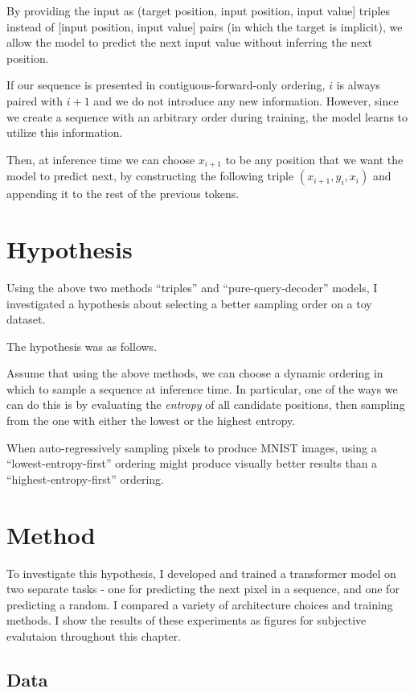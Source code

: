 By providing the input as (target position, input position, input value] triples instead of [input position, input value] pairs (in which the target is implicit), we allow the model to predict the next input value without inferring the next position.

If our sequence is presented in contiguous-forward-only ordering, $i$ is always paired with $i+1$ and we do not introduce any new information. However, since we create a sequence with an arbitrary order during training, the model learns to utilize this information.

Then, at inference time we can choose $x_{i+1}$ to be any position that we want the model to predict next, by constructing the following triple $(x_{i+1}, y_i, x_i)$ and appending it to the rest of the previous tokens.


\section{Hypothesis}
\label{s:a-o-hypotheses}

Using the above two methods ``triples'' and ``pure-query-decoder'' models, I investigated a hypothesis about selecting a better sampling order on a toy dataset.

The hypothesis was as follows.

Assume that using the above methods, we can choose a dynamic ordering in which to sample a sequence at inference time. In particular, one of the ways we can do this is by evaluating the \textit{entropy} of all candidate positions, then sampling from the one with either the lowest or the highest entropy.

When auto-regressively sampling pixels to produce MNIST images, using a ``lowest-entropy-first'' ordering might produce visually better results than a ``highest-entropy-first'' ordering.

\section{Method}

To investigate this hypothesis, I developed and trained a transformer model on two separate tasks - one for predicting the next pixel in a sequence, and one for predicting a random. I compared a variety of architecture choices and training methods. I show the results of these experiments as figures for subjective evalutaion throughout this chapter.

\subsection{Data}

